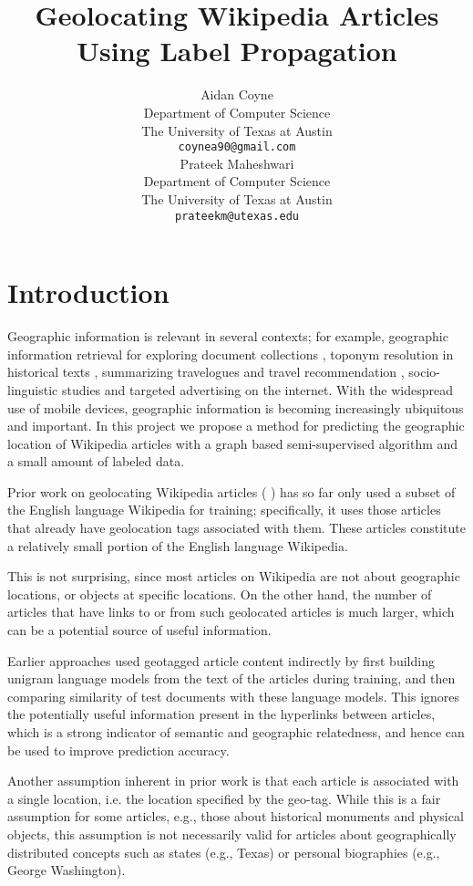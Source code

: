 \documentclass[11pt]{article}
\title{Geolocating Wikipedia Articles Using Label Propagation}
\author{
  Aidan Coyne \\
    Department of Computer Science\\
    The University of Texas at Austin\\
  {\tt coynea90@gmail.com} \\ 
  \And
  Prateek Maheshwari\\
    Department of Computer Science\\
    The University of Texas at Austin\\
  {\tt prateekm@utexas.edu}
}
\date{}
\newcommand{\comment}[1]{}
\begin{document}
\maketitle



\section{Introduction}
\comment{You can now enclose text in a comment block to comment it out inline}
Geographic information is relevant in several contexts; for example, geographic information retrieval for exploring document collections \cite{ding2000computing}, toponym resolution in historical texts \cite{smith2001disambiguating}, summarizing travelogues and travel recommendation \cite{hao-et-al:10}, socio-linguistic studies \cite{eisenstein-smith-xing:11} and targeted advertising on the internet. With the widespread use of mobile devices, geographic information is becoming increasingly ubiquitous and important. In this project we propose a method for predicting the geographic location of Wikipedia articles with a graph based semi-supervised algorithm and a small amount of labeled data.

Prior work on geolocating Wikipedia articles (\cite{wing-baldridge:11} \cite{rolleretal:12}) has so far only used a subset of the English language Wikipedia for training; specifically, it uses those articles that already have geolocation tags associated with them. 
These articles constitute a relatively small portion of the English language Wikipedia.
\comment{find actual figure}
This is not surprising, since most articles on Wikipedia are not about geographic locations, or objects at specific locations.
On the other hand, the number of articles that have links to or from such geolocated articles is much larger, which can be a potential source of useful information.
\comment{ find actual figure}

Earlier approaches used geotagged article content indirectly by first building unigram language models from the text of the articles during training, and then comparing similarity of test documents with these language models.
This ignores the potentially useful information present in the  hyperlinks between articles, which is a strong indicator of semantic and geographic relatedness, and hence can be used to improve prediction accuracy.

Another assumption inherent in prior work is that each article is associated with a single location, i.e. the location specified by the geo-tag.
While this is a fair assumption for some articles, e.g., those about historical monuments and physical objects, this assumption is not necessarily valid for articles about geographically distributed concepts such as states (e.g., Texas) or personal biographies (e.g., George Washington). 
\end{document}

